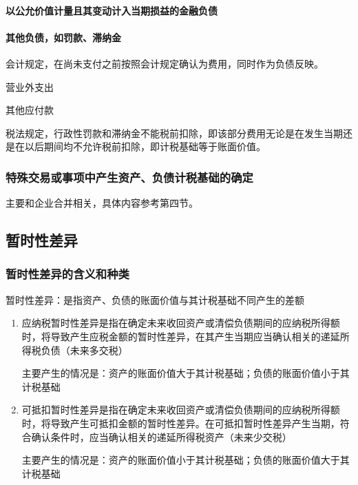 \documentclass[UTF8,12pt]{ctexart}
\newenvironment{Dr}{%
	\begin{list}{}%
		{
			\setlength{\leftmargin}{2em}
			\setlength{\labelwidth}{2em}
			\setlength{\labelsep}{0pt}
			\setlength{\itemindent}{0pt}
			\setlength{\listparindent}{0pt}
			\setlength{\parsep}{0pt}
			\setlength{\topsep}{0pt}
		}
		\item[\textbf{借：}]
	}{%
	\end{list}
}
\newenvironment{Cr}{%
	\begin{list}{}%
		{
			\setlength{\leftmargin}{3em}
			\setlength{\labelwidth}{2em}
			\setlength{\labelsep}{0pt}
			\setlength{\itemindent}{0pt}
			\setlength{\listparindent}{0pt}
			\setlength{\parsep}{0pt}
			\setlength{\topsep}{0pt}
		}
		\item[\textbf{贷：}]
	}{%
	\end{list}
}
\numberwithin{equation}{section} %
\numberwithin{figure}{section}
\numberwithin{table}{section}
\begin{document}
	\paragraph{以公允价值计量且其变动计入当期损益的金融负债}
	
	\paragraph{其他负债，如罚款、滞纳金}
	会计规定，在尚未支付之前按照会计规定确认为费用，同时作为负债反映。
	\begin{Dr}
		营业外支出
	\end{Dr}
	\begin{Cr}
		其他应付款
	\end{Cr}
	
	税法规定，行政性罚款和滞纳金不能税前扣除，即该部分费用无论是在发生当期还是在以后期间均不允许税前扣除，即计税基础等于账面价值。
	
	
	\subsubsection{特殊交易或事项中产生资产、负债计税基础的确定}
	主要和企业合并相关，具体内容参考第四节。
	
	\subsection{暂时性差异}
	\subsubsection{暂时性差异的含义和种类}
	暂时性差异：是指资产、负债的账面价值与其计税基础不同产生的差额
	\begin{enumerate}
		\item 应纳税暂时性差异是指在确定未来收回资产或清偿负债期间的应纳税所得额时，将导致产生应税金额的暂时性差异，在其产生当期应当确认相关的递延所得税负债（未来多交税）
		
		主要产生的情况是：资产的账面价值大于其计税基础；负债的账面价值小于其计税基础

		
		\item 可抵扣暂时性差异是指在确定未来收回资产或清偿负债期间的应纳税所得额时，将导致产生可抵扣金额的暂时性差异。在可抵扣暂时性差异产生当期，符合确认条件时，应当确认相关的递延所得税资产（未来少交税）
		
		主要产生的情况是：资产的账面价值小于其计税基础；负债的账面价值大于其计税基础

		
	\end{enumerate}
\end{document}
